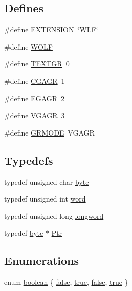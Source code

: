 \subsection*{Defines}
\begin{DoxyCompactItemize}
\item 
\#define \hyperlink{ID__HEAD_8H_a7489acf4773e622a802155319f0533e8}{EXTENSION}~\char`\"{}WLF\char`\"{}
\item 
\#define \hyperlink{ID__HEAD_8H_a94127cc7d8cfd3ad02d2369ddd49f839}{WOLF}
\item 
\#define \hyperlink{ID__HEAD_8H_ab90640f67729ad8aaf1259890da41991}{TEXTGR}~0
\item 
\#define \hyperlink{ID__HEAD_8H_a045d990095288b25b52f2070ff2039cc}{CGAGR}~1
\item 
\#define \hyperlink{ID__HEAD_8H_a71430ee3dc4354e7efe5e73dca3adef1}{EGAGR}~2
\item 
\#define \hyperlink{ID__HEAD_8H_ac68ed8fd8f6e4946ede4e0f72d3d0d38}{VGAGR}~3
\item 
\#define \hyperlink{ID__HEAD_8H_a527063f32c8f25143b04f53ac1782a60}{GRMODE}~VGAGR
\end{DoxyCompactItemize}
\subsection*{Typedefs}
\begin{DoxyCompactItemize}
\item 
typedef unsigned char \hyperlink{ID__HEAD_8H_a0c8186d9b9b7880309c27230bbb5e69d}{byte}
\item 
typedef unsigned int \hyperlink{ID__HEAD_8H_abad51e07ab6d26bec9f1f786c8d65bcd}{word}
\item 
typedef unsigned long \hyperlink{ID__HEAD_8H_a8a9a7dd50c6fdb45dcdf0eb929479663}{longword}
\item 
typedef \hyperlink{ID__HEAD_8H_a0c8186d9b9b7880309c27230bbb5e69d}{byte} $\ast$ \hyperlink{ID__HEAD_8H_a12c6a4af9f1e5c1a48e22de17a94ed1b}{Ptr}
\end{DoxyCompactItemize}
\subsection*{Enumerations}
\begin{DoxyCompactItemize}
\item 
enum \hyperlink{ID__HEAD_8H_a7c6368b321bd9acd0149b030bb8275ed}{boolean} \{ \hyperlink{ID__HEAD_8H_a7c6368b321bd9acd0149b030bb8275edae9de385ef6fe9bf3360d1038396b884c}{false}, 
\hyperlink{ID__HEAD_8H_a7c6368b321bd9acd0149b030bb8275eda08f175a5505a10b9ed657defeb050e4b}{true}, 
\hyperlink{ID__HEADS_8H_a7c6368b321bd9acd0149b030bb8275edae9de385ef6fe9bf3360d1038396b884c}{false}, 
\hyperlink{ID__HEADS_8H_a7c6368b321bd9acd0149b030bb8275eda08f175a5505a10b9ed657defeb050e4b}{true}
 \}
\end{DoxyCompactItemize}
